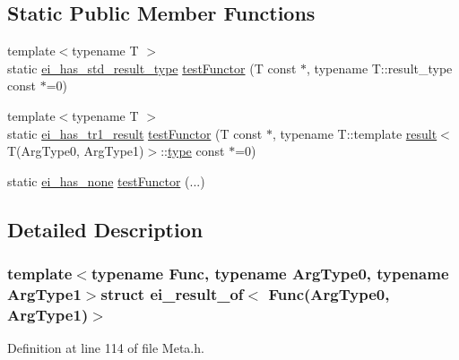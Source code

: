 \subsection*{Static Public Member Functions}
\begin{DoxyCompactItemize}
\item 
{\footnotesize template$<$typename T $>$ }\\static \hyperlink{structei__has__std__result__type}{ei\-\_\-has\-\_\-std\-\_\-result\-\_\-type} \hyperlink{structei__result__of_3_01_func_07_arg_type0_00_01_arg_type1_08_4_a64221c672b9506ca9c118d8625d9bcce}{test\-Functor} (T const $\ast$, typename T\-::result\-\_\-type const $\ast$=0)
\item 
{\footnotesize template$<$typename T $>$ }\\static \hyperlink{structei__has__tr1__result}{ei\-\_\-has\-\_\-tr1\-\_\-result} \hyperlink{structei__result__of_3_01_func_07_arg_type0_00_01_arg_type1_08_4_af466cf95ab376c80f69bc5b49ee42fe1}{test\-Functor} (T const $\ast$, typename T\-::template \hyperlink{qxtslotjob_8h_aab161efab0511ea9612b64c40e9852ca}{result}$<$ T(Arg\-Type0, Arg\-Type1)$>$\-::\hyperlink{structei__result__of_3_01_func_07_arg_type0_00_01_arg_type1_08_4_a6232bd65458d646fec6f99ae535593c4}{type} const $\ast$=0)
\item 
static \hyperlink{structei__has__none}{ei\-\_\-has\-\_\-none} \hyperlink{structei__result__of_3_01_func_07_arg_type0_00_01_arg_type1_08_4_ac68fc2ef34d1380193065001fc43c6b0}{test\-Functor} (...)
\end{DoxyCompactItemize}


\subsection{Detailed Description}
\subsubsection*{template$<$typename Func, typename Arg\-Type0, typename Arg\-Type1$>$struct ei\-\_\-result\-\_\-of$<$ Func(\-Arg\-Type0, Arg\-Type1)$>$}



Definition at line 114 of file Meta.\-h.



